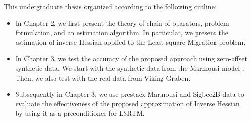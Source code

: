 This undergraduate thesis organized according to the following outline:
 
\begin{itemize}

\item In Chapter 2, we first present the theory of chain of oparators, problem formulation, and an estimation algorithm. In particular, we present the estimation of inverse Hessian applied to the Least-square Migration problem. 

\item In Chapter 3, we test the accuracy of the proposed approach using zero-offset synthetic data. We start with the synthetic data from the Marmousi model \cite[]{versteeg1994}. Then, we also test with the real data from Viking Graben. 

\item Subsequently in Chapter 3, we use prestack Marmousi and Sigbee2B data to evaluate the effectiveness of the proposed approximation of Inverse Hessian by using it as a preconditioner for LSRTM.
\end{itemize}
